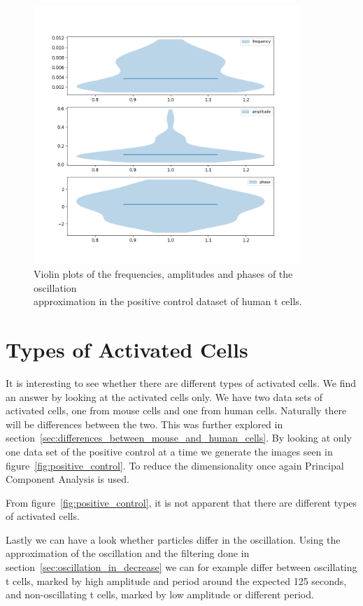 \begin{figure}[h!]
	\centering
	\includegraphics[width=0.9\textwidth]{fig/freq_amp}
	
	\caption{Violin plots of the frequencies, amplitudes and phases of the oscillation\\ approximation in the positive control dataset of human t cells.}
	\label{fig:freq_amp}
\end{figure}

\newpage
\section{Types of Activated Cells}

It is interesting to see whether there are different types of activated cells. We find an answer by looking at the activated cells only. We have two data sets of activated cells, one from mouse cells and one from human cells. Naturally there will be differences between the two. This was further explored in section~\ref{sec:differences_between_mouse_and_human_cells}. By looking at only one data set of the positive control at a time we generate the images seen in figure~\ref{fig:positive_control}. To reduce the dimensionality once again Principal Component Analysis is used.

From figure~\ref{fig:positive_control}, it is not apparent that there are different types of activated cells.

Lastly we can have a look whether particles differ in the oscillation. Using the\\ approximation of the oscillation and the filtering done in section~\ref{sec:oscillation_in_decrease} we can for example differ between oscillating t cells, marked by high amplitude and period around the expected 125 seconds, and non-oscillating t cells, marked by low amplitude or different period.

